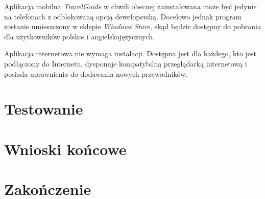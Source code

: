 \documentclass{book}
\newcommand{\appName}{\emph{TravelGuide} }
\begin{document}
		Aplikacja mobilna \appName w chwili obecnej zainstalowana może być jedynie na telefonach z odblokowaną opcją deweloperską. Docelowo jednak program zostanie umieszczony w sklepie \emph{Windows Store}, skąd będzie dostępny do pobrania dla użytkowników polsko- i angielskojęzycznych. 
		
		Aplikacja internetowa nie wymaga instalacji. Dostępna jest dla każdego, kto jest podłączony do Internetu, dysponuje kompatybilną przeglądarką internetową i posiada uprawnienia do dodawania nowych przewodników. 
		
	\chapter{Testowanie}
	
	\chapter{Wnioski końcowe}
	
	\chapter{Zakończenie}
	
	
	
	
	
\end{document}
